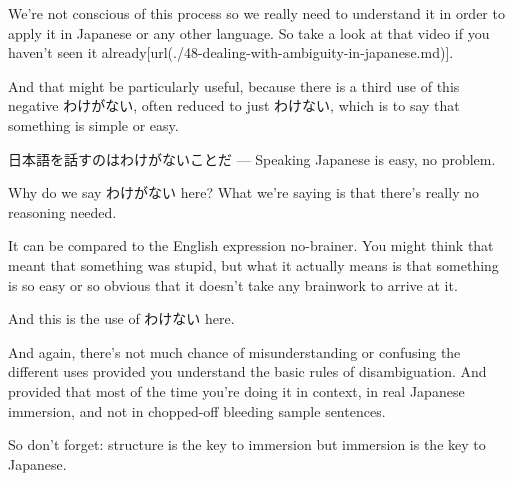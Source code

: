 We're not conscious of this process so we really need to understand it in order to apply it in Japanese or any other language. So take a look at that video if you haven't seen it already\goto{{[}48{]}}[url(./48-dealing-with-ambiguity-in-japanese.md)].

\stopsectionlevel

\startsectionlevel[title={わけがない as simple, easy},reference={わけがない-as-simple-easy}]

And that might be particularly useful, because there is a third use of this negative わけがない, often reduced to just わけない, which is to say that something is simple or easy.

{}

日本語を話すのはわけがないことだ --- Speaking Japanese is easy, no problem.

Why do we say わけがない here? What we're saying is that there's really no reasoning needed.

It can be compared to the English expression no-brainer. You might think that meant that something was stupid, but what it actually means is that something is so easy or so obvious that it doesn't take any brainwork to arrive at it.

And this is the use of わけない here. 

And again, there's not much chance of misunderstanding or confusing the different uses provided you understand the basic rules of disambiguation. And provided that most of the time you're doing it in context, in real Japanese immersion, and not in chopped-off bleeding sample sentences.

So don't forget: structure is the key to immersion but immersion is the key to Japanese.

\stopsectionlevel

\stopsectionlevel

\stopsectionlevel
